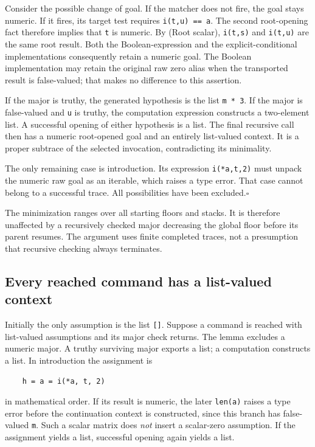 \documentclass[11pt,letterpaper]{article}
\theoremstyle{definition}\newtheorem{definition}[theorem]{Definition}
\theoremstyle{remark}\newtheorem{remark}[theorem]{Remark}
\begin{document}
Consider the possible change of goal.  If the matcher does not fire,
the goal stays numeric.  If it fires, its target test requires
\texttt{i(t,u) == a}.  The second root-opening fact therefore implies
that \texttt{t} is numeric.  By (Root scalar), \texttt{i(t,s)} and
\texttt{i(t,u)} are the same root result.  Both the Boolean-expression
and the explicit-conditional implementations consequently retain a
numeric goal.  The Boolean implementation may retain the original raw
zero alias when the transported result is false-valued; that makes no
difference to this assertion.

If the major is truthy, the generated hypothesis is the list
\texttt{m * 3}.  If the major is false-valued and \texttt{u} is truthy,
the computation expression constructs a two-element list.  A successful
opening of either hypothesis is a list.  The final recursive call then
has a numeric root-opened goal and an entirely list-valued context.  It
is a proper subtrace of the selected invocation, contradicting its
minimality.

The only remaining case is introduction.  Its expression
\texttt{i(*a,t,2)} must unpack the numeric raw goal as an iterable,
which raises a type error.  That case cannot belong to a successful
trace.  All possibilities have been excluded.\hfill$\square$

The minimization ranges over all starting floors and stacks.  It is
therefore unaffected by a recursively checked major decreasing the
global floor before its parent resumes.  The argument uses finite
completed traces, not a presumption that recursive checking always
terminates.

\subsection{Every reached command has a list-valued context}

Initially the only assumption is the list \texttt{[]}.  Suppose a
command is reached with list-valued assumptions and its major check
returns.  The lemma excludes a numeric major.  A truthy surviving major
exports a list; a computation constructs a list.  In introduction the
assignment is
\begin{verbatim}
    h = a = i(*a, t, 2)
\end{verbatim}
in mathematical order.  If its result is numeric, the later
\texttt{len(a)} raises a type error before the continuation context is
constructed, since this branch has false-valued \texttt{m}.  Such a
scalar matrix does \emph{not} insert a scalar-zero assumption.  If the
assignment yields a list, successful opening again yields a list.
\end{document}
